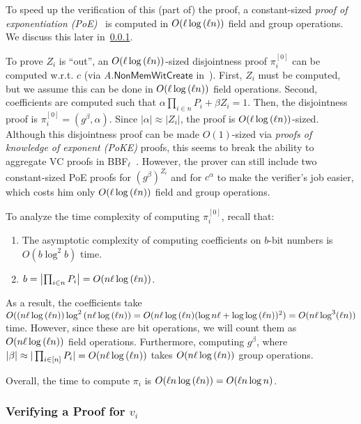 To speed up the verification of this (part of) the proof, a constant-sized \textit{proof of exponentiation (PoE)}~\cite{BBF18} is computed in $O(\ell\log{(\ell n)})$ field and group operations.
We discuss this later in~\cref{s:complexity-bbf:verify-one-proof}.

To prove $Z_i$ is ``out'', an $O(\ell \log{(\ell n)})$-sized disjointness proof $\pi_i^{[0]}$ can be computed w.r.t. $c$ (via \textit{A}.$\mathsf{NonMemWitCreate}$ in~\cite[Sec 4.1, pg. 14]{BBF18}).
First, $Z_i$ must be computed, but we assume this can be done in $O(\ell\log{(\ell n)})$ field operations.
Second, \bezout coefficients are computed such that $\alpha \prod_{i\in n} P_i + \beta Z_i =1$.
Then, the disjointness proof is $\pi_i^{[0]}=(g^{\beta},\alpha)$.
Since $|\alpha| \approx |Z_i|$, the proof is $O(\ell \log{(\ell n)})$-sized.
Although this disjointness proof can be made $O(1)$-sized via \textit{proofs of knowledge of exponent (PoKE)} proofs, this seems to break the ability to aggregate VC proofs in BBF$_\ell$~\cite[Sec 5.2, pg. 20]{BBF18}.
However, the prover can still include two constant-sized  PoE proofs for $(g^{\beta})^{Z_i}$ and for $c^{\alpha}$ to make the verifier's job easier, which costs him only $O(\ell \log{(\ell n)})$ field and group operations.

To analyze the time complexity of computing $\pi_i^{[0]}$, recall that:
\begin{enumerate}
    \item The asymptotic complexity of computing \bezout coefficients on $b$-bit numbers is $O(b\log^2{b})$ time.
    \item $b=\left|\prod_{i\in n} P_i\right|=O(n\ell \log{(\ell n)})$.
\end{enumerate}
As a result, the \bezout coefficients take $O((n\ell\log{(\ell n)}) \log^2{(n \ell\log{(\ell n)})=O(n\ell\log{(\ell n)} (\log{n\ell} + \log{\ensuremath{\log{(\ell n)}}})^2)}=O(n\ell\log^3(\ell n))$ time.
However, since these are bit operations, we will count them as $O(n\ell \log{(\ell n)})$ field operations.
Furthermore, computing $g^{\beta}$, where $|\beta|\approx|\prod_{i\in[n]}P_i|=O(n\ell\log{(\ell n)})$ takes $O(n\ell\log{(\ell n)})$ group operations.

Overall, the time to compute $\pi_i$ is $O(\ell n\log{(\ell n)})=O(\ell n\log{n})$.

\subsubsection{Verifying a Proof for $v_i$}
\label{s:complexity-bbf:verify-one-proof}

